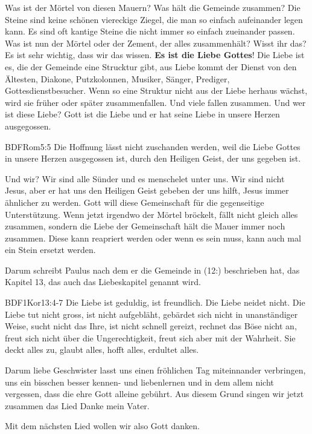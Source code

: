 \documentclass{../../inc/mybib}
\begin{document}
\begin{spacing}{1.5}
Was ist der Mörtel von diesen Mauern? Was hält die Gemeinde zusammen? Die Steine sind keine schönen viereckige Ziegel, die man so einfach aufeinander legen kann. Es sind oft kantige Steine die nicht immer so einfach zueinander passen. Was ist nun der Mörtel oder der Zement, der alles zusammenhält? Wisst ihr das? Es ist sehr wichtig, dass wir das wissen. \textbf{Es ist die Liebe Gottes}! Die Liebe ist es, die der Gemeinde eine Strucktur gibt, aus Liebe kommt der Dienst von den Ältesten, Diakone, Putzkolonnen, Musiker, Sänger, Prediger, Gottesdienstbesucher. Wenn so eine Struktur nicht aus der Liebe herhaus wächst, wird sie früher oder später zusammenfallen. Und viele fallen zusammen. Und wer ist diese Liebe? Gott ist die Liebe und er hat seine Liebe in unsere Herzen ausgegossen.
\begin{bibelbox}{BDF}{Rom}{5:5}
    Die Hoffnung lässt nicht zuschanden werden, weil die Liebe Gottes in unsere Herzen ausgegossen ist, durch den Heiligen Geist, der uns gegeben ist.
\end{bibelbox}

Und wir? Wir sind alle Sünder und es menschelet unter uns. Wir sind nicht Jesus, aber er hat uns den Heiligen Geist gebeben der uns hilft, Jesus immer ähnlicher zu werden. Gott will diese Gemeinschaft für die gegenseitige Unterstützung. Wenn jetzt irgendwo der Mörtel bröckelt, fällt nicht gleich alles zusammen, sondern die Liebe der Gemeinschaft hält die Mauer immer noch zusammen. Diese kann reapriert werden oder wenn es sein muss, kann auch mal ein Stein ersetzt werden.

Darum schreibt Paulus nach dem er die Gemeinde in (12:) beschrieben hat, das Kapitel 13, das auch das Liebeskapitel genannt wird.

\begin{bibelbox}{BDF}{1Kor}{13:4-7}
Die Liebe ist geduldig, ist freundlich. Die Liebe neidet nicht. Die Liebe tut nicht gross, ist nicht aufgebläht, gebärdet sich nicht in unanständiger Weise, sucht nicht das Ihre, ist nicht schnell gereizt, rechnet das Böse nicht an, freut sich nicht über die Ungerechtigkeit, freut sich aber mit der Wahrheit. Sie deckt alles zu, glaubt alles, hofft alles, erdultet alles.
\end{bibelbox}

Darum liebe Geschwister lasst uns einen fröhlichen Tag miteinnander verbringen, uns ein bisschen besser kennen- und liebenlernen und in dem allem nicht vergessen, dass die ehre Gott alleine gebührt. Aus diesem Grund singen wir jetzt zusammen das Lied Danke mein Vater.

Mit dem nächsten Lied wollen wir also Gott danken.
\end{spacing}
\end{document}
